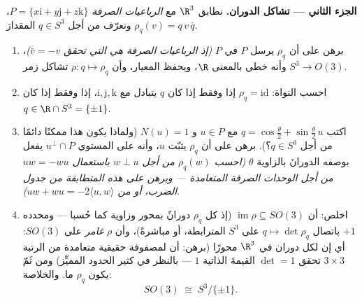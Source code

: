 \begin{problem}
\medskip
\noindent\textbf{الجزء الثاني --- تشاكل الدوران.} نطابق $\R^3$
مع \emph{الرباعيات الصرفة} $P = \{x\mathrm i +
y\mathrm j + z\mathrm k\}$، ونعرّف من أجل $q \in S^3$
المقدارَ $\rho_q(v) = q\,v\,\bar q$.
\begin{enumerate}[resume]
  \item برهن على أن $\rho_q$ يرسل $P$ في $P$ \emph{(إذ
        الرباعيات الصرفة هي التي تحقق $\bar v = -v$)}، وأنه
        خطي بالمعنى $\R$، ويحفظ المعيار، وأن $\rho
        \colon q \mapsto \rho_q$ تشاكل زمر
        $S^3
        \to O(3)$.
  \item احسب النواة: $\rho_q = \mathrm{id}$ إذا وفقط إذا كان $q$ يتبادل مع
        $\mathrm i, \mathrm j, \mathrm k$، إذا وفقط إذا كان $q \in \R\cap S^3 = \{\pm1\}$.
  \item اكتب $q = \cos\frac\theta2 + \sin\frac\theta2\,u$ مع $u \in P$ و $N(u) = 1$ (ولماذا يكون
        هذا ممكنًا دائمًا من أجل $q \in S^3$؟). برهن على أن
        $\rho_q$ يثبّت $u$، وأنه على المستوي $u^\perp\cap P$
        يفعل بوصفه الدورانَ بالزاوية $\theta$ \emph{(احسب
        $\rho_q(w)$ من أجل $w \perp u$ باستعمال $uw = -wu$
        من أجل الوحدات الصرفة المتعامدة --- وبرهن على هذه
        المتطابقة من جدول الضرب، أو من $uw + wu =
        -2\langle u, w\rangle$)}.
  \item اخلص: أن $\operatorname{im}\rho \subseteq SO(3)$ (إذ كل $\rho_q$ دورانٌ بمحور وزاوية
        كما حُسبا --- ومحدده $+1$ باتصال $q
        \mapsto \det\rho_q$ على $S^3$
        المترابطة، أو مباشرةً)، وأن $\rho$ \emph{غامر} على
        $SO(3)$: أي إن لكل دوران في $\R^3$ محورًا (برهن: أن
        لمصفوفة حقيقية متعامدة من الرتبة $3\times3$ تحقق
        $\det = 1$ القيمةَ الذاتية $1$ --- بالنظر في كثير الحدود
        المميِّز) ومن ثَمّ يكون $\rho_q$ ما. والخلاصة:
        \[
        SO(3) \;\cong\; S^3/\{\pm 1\} .
        \]
\end{enumerate}


\end{problem}
